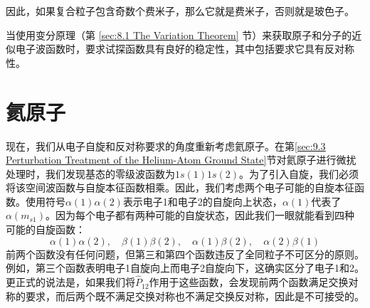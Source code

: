     因此，如果复合粒子包含奇数个费米子，那么它就是费米子，否则就是玻色子。

    当使用变分原理（第 \ref{sec:8.1 The Variation Theorem} 节）来获取原子和分子的近似电子波函数时，要求试探函数具有良好的稳定性，其中包括要求它具有反对称性。

\section{氦原子}
\label{sec:10.4 Th Helium Atom}

    现在，我们从电子自旋和反对称要求的角度重新考虑氦原子。在第\ref{sec:9.3 Perturbation Treatment of the Helium-Atom Ground State}节对氦原子进行微扰处理时，我们发现基态的零级波函数为$1s\left(1\right)1s\left(2\right)$。为了引入自旋，我们必须将该空间波函数与自旋本征函数相乘。因此，我们考虑两个电子可能的自旋本征函数。使用符号$\alpha\left(1\right)\alpha\left(2\right)$表示电子1和电子2的自旋向上状态，$\alpha\left(1\right)$代表了$\alpha\left(m_{s1}\right)$。因为每个电子都有两种可能的自旋状态，因此我们一眼就能看到四种可能的自旋函数：
    \begin{equation*}
        \alpha\left(1\right)\alpha\left(2\right), \quad \beta\left(1\right)\beta\left(2\right), \quad \alpha\left(1\right)\beta\left(2\right), \quad \alpha\left(2\right)\beta\left(1\right)
    \end{equation*}
    前两个函数没有任何问题，但第三和第四个函数违反了全同粒子不可区分的原则。例如，第三个函数表明电子1自旋向上而电子2自旋向下，这确实区分了电子1和2。更正式的说法是，如果我们将$\hat{P}_{12}$作用于这些函数，会发现前两个函数满足交换对称的要求，而后两个既不满足交换对称也不满足交换反对称，因此是不可接受的。

